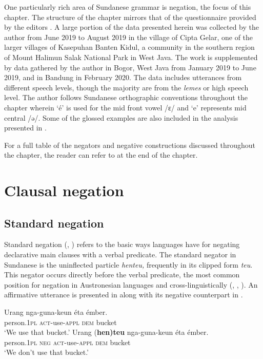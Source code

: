 \documentclass[output=paper]{langscibook}
\begin{document}
One particularly rich area of Sundanese grammar is negation, the focus of this chapter. The structure of the chapter mirrors that of the questionnaire provided by the editors .
A large portion of the data presented herein was collected by the author from June 2019 to August 2019 in the village of Cipta Gelar, one of the larger villages of Kasepuhan Banten Kidul, a community in the southern region of Mount Halimun Salak National Park in West Java. 
The work is supplemented by data gathered by the author in Bogor, West Java from January 2019 to June 2019, and in Bandung in February 2020. The data includes utterances from different speech levels, though the majority are from the \textit{lemes} or high speech level. The author follows Sundanese orthographic conventions throughout the chapter wherein ‘é’ is used for the mid front vowel /ɛ/\textsf{} and ‘e’ represents mid central /ə/. Some of the glossed examples are also included in the analysis presented in \citet{Butters2021}. 

For a full table of the negators and negative constructions discussed throughout the chapter, the reader can refer to  at the end of the chapter. 

\section{Clausal negation}\label{sec:sun:2}

\subsection{Standard negation}\label{sec:sun:2.1}

Standard negation (\citealt{Payne1985}, \citealt{Miestamo2005}) refers to the basic ways languages have for negating declarative main clauses with a verbal predicate. The standard negator in Sundanese is the uninflected particle \textit{henteu,} frequently in its clipped form \textit{teu}. This negator occurs directly before the verbal predicate, the most common position for negation in Austronesian languages \citep[61]{VossenAuwera2014} and cross-linguistically (\citealt{Dahl1979}, \citealt{Dryer2013}, \citealt[411]{AuweraDumon2015}). An affirmative utterance is presented in  along with its negative counterpart in . 

\ea\label{ex:sun:1}
    \ea\label{ex:sun:1a}
        \gll  Urang nga-guna-keun éta émber.\\ 
              person.1\textsc{pl} \textsc{act}{}-use-\textsc{appl} \textsc{dem} bucket\\
        \glt ‘We use that bucket.’
    \ex\label{ex:sun:1b}
        \gll  Urang (\textbf{hen)teu} nga-guna-keun éta émber.\\
             person.1\textsc{pl} \textsc{neg} \textsc{act}{}-use-\textsc{appl} \textsc{dem} bucket\\
        \glt ‘We don’t use that bucket.’ 
    \z
\z 
\end{document}

